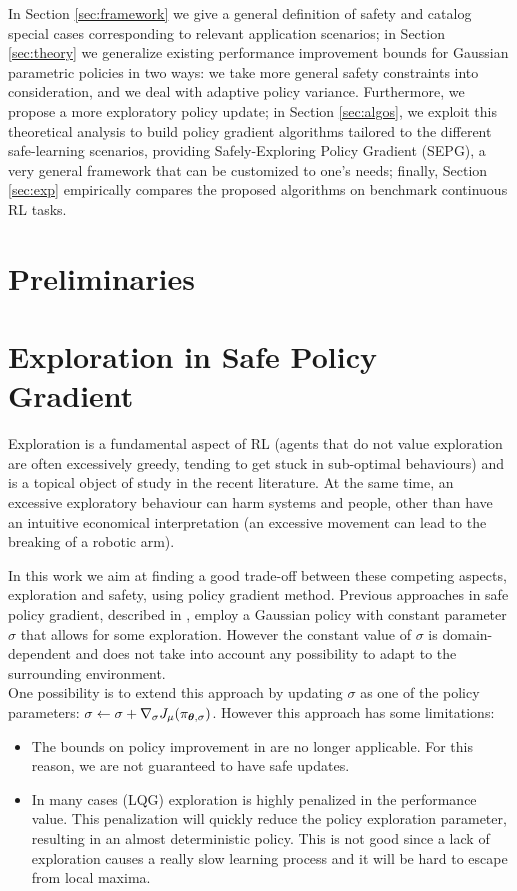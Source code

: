 In Section \ref{sec:framework} we give a general definition of safety and catalog special cases corresponding to relevant application scenarios; in Section \ref{sec:theory} we generalize existing performance improvement bounds for Gaussian parametric policies in two ways: we take more general safety constraints into consideration, and we deal with adaptive policy variance. Furthermore, we propose a more exploratory policy update; in Section \ref{sec:algos}, we exploit this theoretical analysis to build policy gradient algorithms tailored to the different safe-learning scenarios, providing Safely-Exploring Policy Gradient (SEPG), a very general framework that can be customized to one's needs; finally, Section \ref{sec:exp} empirically compares the proposed algorithms on benchmark continuous RL tasks.



\section{Preliminaries}\label{sec:sepg-prelim}




\section{Exploration in Safe Policy Gradient}\label{sec:sepg-intro}
Exploration is a fundamental aspect of RL (agents that do not value exploration are often excessively greedy, tending to get stuck in sub-optimal behaviours) and is a topical object of study in the recent literature. At the same time, an excessive exploratory behaviour can harm systems and people, other than have an intuitive economical interpretation (\eg an excessive movement can lead to the breaking of a robotic arm).

In this work we aim at finding a good trade-off between these competing aspects, exploration and safety, using policy gradient method. Previous approaches in safe policy gradient, described in , employ a Gaussian policy with constant parameter $\sigma$ that allows for some exploration. However the constant value of $\sigma$ is domain-dependent and does not take into account any possibility to adapt to the surrounding environment.\\
One possibility is to extend this approach by updating $\sigma$ as one of the policy parameters: $\sigma \gets \sigma + \nabla_\sigma J_\mu(\pi_{{\boldsymbol{\theta}},\sigma})$. However this approach has some limitations:
\begin{itemize}
\item The bounds on policy improvement in \cite{adaptive_step} are no longer applicable. For this reason, we are not guaranteed to have safe updates.
\item In many cases (\eg LQG) exploration is highly penalized in the performance value. This penalization will quickly reduce the policy exploration parameter, resulting in an almost deterministic policy. This is not good since a lack of exploration causes a really slow learning process and it will be hard to escape from local maxima.
\end{itemize}

